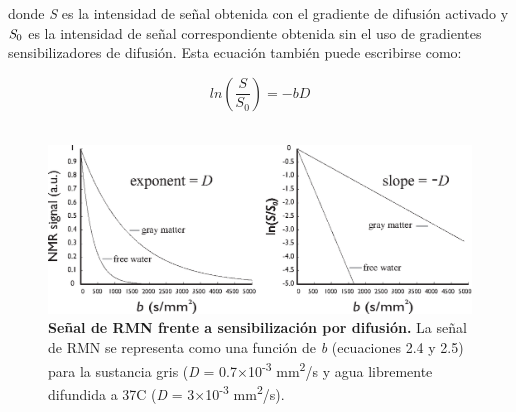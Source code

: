\documentclass[12pt,a5,twoside]{book}
\begin{document}
donde {\it S} es la intensidad de señal obtenida con el gradiente de difusión activado y ${\it S}_0$ es la intensidad de señal correspondiente obtenida sin el uso de gradientes sensibilizadores de difusión. Esta ecuación también puede escribirse como:

\begin{equation}
ln (\frac{S}{S_0}) = -bD
\end{equation}\\

\begin{figure}
	\centering
    \includegraphics [scale=0.9,center] {expDecay_signal_b_2panels.eps}
    \caption{\textbf{Señal de RMN frente a sensibilización por difusión.} La señal de RMN se representa como una función de {\it b} (ecuaciones 2.4 y 2.5) para la sustancia gris ({\it D} = 0.7×10\textsuperscript{-3} mm\textsuperscript{2}/s y agua libremente difundida a 37\textdegree{}C ({\it D} = 3×10\textsuperscript{-3} mm\textsuperscript{2}/s).}
    \label{F:expDecay_signal_b_2panels}
\end{figure}
\end{document}
